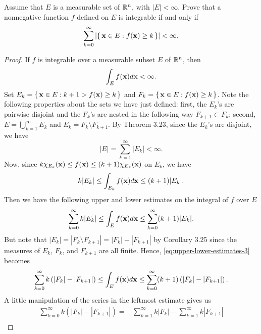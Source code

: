 \begin{problem}
Assume that $E$ is a measurable set of $\mathbb{R}^n$, with
$|E|<\infty$. Prove that a nonnegative function $f$ defined
on $E$ is integrable if and only if
\[
\sum_{k=0}^\infty\left|\left\{\,\mathbf{x}\in E:f(\mathbf{x})\geq
    k\,\right\}\right|<\infty.
\]
\end{problem}
\begin{proof}
If $f$ is integrable over a measurable subset $E$ of $\mathbb{R}^n$, then
\begin{equation}
\label{eq:integrability-3}
\int_E f(\mathbf{x}) d \mathbf{x}<\infty.
\end{equation}
Set $E_k=\left\{\,\mathbf{x}\in E:k+1>f(\mathbf{x})\geq k\,\right\}$ and
$F_k=\left\{\,\mathbf{x}\in E:f(\mathbf{x})\geq k\,\right\}$. Note the
following properties about the sets we have just defined: first, the
$E_k$'s are pairwise disjoint and the $F_k$'s are nested in the following
way $F_{k+1}\subset F_k$; second, $E=\bigcup_{k=1}^\infty E_k$ and
$E_k=F_k\setminus F_{k+1}$. By Theorem 3.23, since the $E_k$'s are disjoint,
we have
\begin{equation}
  \label{eq:disjoint-measurable-sets-3}
|E|=\sum_{k=1}^\infty|E_k|<\infty.
\end{equation}
Now, since $k\chi_{E_k}(\mathbf{x})\leq f(\mathbf{x})\leq (k+1)\chi_{E_k}(\mathbf{x})$ on
$E_k$, we have
\begin{equation}
\label{eq:estimates-E-k-3}
k|E_k|\leq\int_{E_k}f(\mathbf{x}) d \mathbf{x}\leq (k+1)|E_k|.
\end{equation}
Then we have the following upper and lower estimates on the integral of $f$
over $E$
\begin{equation}
\label{eq:upper-lower-estimates-3}
\sum_{k=0}^\infty k|E_k|\leq\int_E f(\mathbf{x}) d \mathbf{x}\leq\sum_{k=0}^\infty(k+1)|E_k|.
\end{equation}
But note that $|E_k|=|F_k\setminus F_{k+1}|=|F_k|-|F_{k+1}|$ by Corollary 3.25
since the measures of $E_k$, $F_k$, and $F_{k+1}$ are all finite. Hence,
\eqref{eq:upper-lower-estimates-3} becomes
\begin{equation}
\label{eq:new-upper-lower-estimates-3}
\sum_{k=0}^\infty k\left(|F_k|-|F_{k+1}|\right)\leq
\int_E f(\mathbf{x}) d \mathbf{x}\leq
\sum_{k=0}^\infty (k+1)\left(|F_k|-|F_{k+1}|\right).
\end{equation}
A little manipulation of the series in the leftmost estimate gives us
\begin{equation}
\label{eq:leftmost-estimate-3}
\begin{aligned}
\sum_{k=0}^\infty k\left(|F_k|-|F_{k+1}|\right)
={}&\sum_{k=1}^\infty k|F_k|-\sum_{k=1}^\infty k|F_{k+1}|\\

\end{aligned}
\end{equation}
\end{proof}
